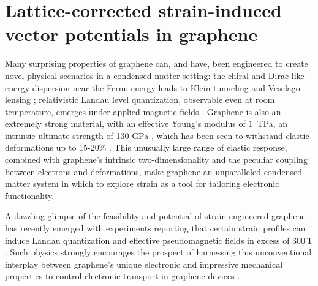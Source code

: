 \chapter{Lattice-corrected strain-induced vector potentials in graphene}

Many surprising properties of graphene can, and have, been engineered to create novel physical scenarios in a condensed matter setting: the chiral and Dirac-like energy dispersion near the Fermi energy leads to Klein tunneling \cite{Beenakker2008} and Veselago lensing \cite{Cheianov2007}; relativistic Landau level quantization, observable even at room temperature, emerges under applied magnetic fields \cite{Novoselov2007}.
Graphene is also an extremely strong material, with an effective Young's modulus of 1~TPa, an intrinsic ultimate strength of 130 GPa \cite{Lee2008}, which  has been seen to withstand elastic deformations up to 15-20\% \cite{Cadelano2009}.
This unusually large range of elastic response, combined with graphene's intrinsic two-dimensionality and the peculiar coupling between electrons and deformations, make graphene an unparalleled condensed matter system in which to explore strain as a tool for tailoring electronic functionality.

A dazzling glimpse of the feasibility and potential of strain-engineered graphene \cite{Pereira2009a,Guinea2009} has recently emerged with experiments reporting that certain strain profiles can induce Landau quantization and effective pseudomagnetic fields in excess of 300\,T \cite{Levy2010,Yan2012,Yeh2011}.
Such physics strongly encourages the prospect of harnessing this unconventional interplay between graphene's unique electronic and impressive mechanical properties to control electronic transport in graphene devices \cite{Pereira2009a, Fogler2008}.

